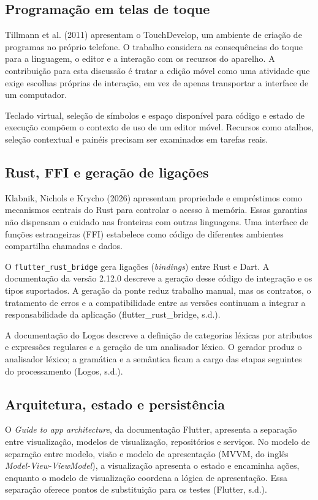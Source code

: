 \documentclass[
    12pt
    ,oneside
    ,a4paper
    ,chapter=TITLE
    ,section=TITLE
    ,sumario=abnt-6027-2012]{abntex2}
\begin{document}
\subsection{Programação em telas de toque}
Tillmann et al. (2011) apresentam o TouchDevelop, um ambiente de criação de
programas no próprio telefone. O trabalho considera as consequências do toque
para a linguagem, o editor e a interação com os recursos do aparelho. A
contribuição para esta discussão é tratar a edição móvel como uma atividade que
exige escolhas próprias de interação, em vez de apenas transportar a interface
de um computador.

Teclado virtual, seleção de símbolos e espaço disponível para código e estado
de execução compõem o contexto de uso de um editor móvel. Recursos como atalhos,
seleção contextual e painéis precisam ser examinados em tarefas reais. 

\subsection{Rust, FFI e geração de ligações}
Klabnik, Nichols e Krycho (2026) apresentam propriedade e empréstimos como
mecanismos centrais do Rust para controlar o acesso à memória. Essas garantias
não dispensam o cuidado nas fronteiras com outras linguagens. Uma interface de
funções estrangeiras (FFI) estabelece como código de diferentes ambientes
compartilha chamadas e dados.

O \texttt{flutter\_rust\_bridge} gera ligações (\textit{bindings}) entre Rust e
Dart. A documentação da versão 2.12.0 descreve a geração desse código de integração
e os tipos suportados. A geração da ponte reduz trabalho manual, mas os contratos,
o tratamento de erros e a compatibilidade entre as versões continuam a integrar
a responsabilidade da aplicação (flutter\_rust\_bridge, s.d.).

A documentação do Logos descreve a definição de categorias léxicas por atributos
e expressões regulares e a geração de um analisador léxico. O gerador produz o analisador léxico; a gramática e a semântica ficam a cargo das etapas seguintes do processamento (Logos, s.d.).

\subsection{Arquitetura, estado e persistência}
O \textit{Guide to app architecture}, da documentação Flutter, apresenta a
separação entre visualização, modelos de visualização, repositórios e serviços.
No modelo de separação entre modelo, visão e modelo de apresentação (MVVM, do inglês \textit{Model-View-ViewModel}), a visualização apresenta o estado e encaminha ações, enquanto
o modelo de visualização coordena a lógica de apresentação. Essa separação
oferece pontos de substituição para os testes (Flutter, s.d.).
\end{document}
